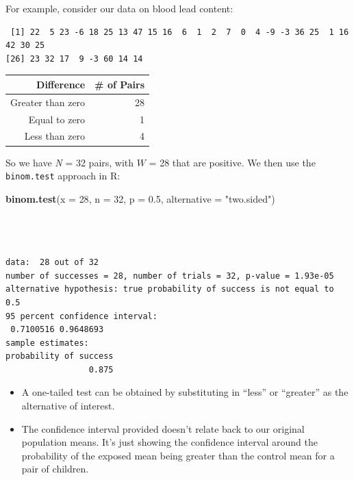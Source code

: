 \documentclass[
]{book}
\newenvironment{Shaded}{\begin{snugshade}}{\end{snugshade}}
\newcommand{\DataTypeTok}[1]{\textcolor[rgb]{0.13,0.29,0.53}{#1}}
\newcommand{\DecValTok}[1]{\textcolor[rgb]{0.00,0.00,0.81}{#1}}
\newcommand{\FloatTok}[1]{\textcolor[rgb]{0.00,0.00,0.81}{#1}}
\newcommand{\KeywordTok}[1]{\textcolor[rgb]{0.13,0.29,0.53}{\textbf{#1}}}
\newcommand{\NormalTok}[1]{#1}
\newcommand{\OperatorTok}[1]{\textcolor[rgb]{0.81,0.36,0.00}{\textbf{#1}}}
\newcommand{\StringTok}[1]{\textcolor[rgb]{0.31,0.60,0.02}{#1}}
\providecommand{\tightlist}{%
  \setlength{\itemsep}{0pt}\setlength{\parskip}{0pt}}
\begin{document}
For example, consider our data on blood lead content:

\begin{Shaded}
\end{Shaded}

\begin{verbatim}
 [1] 22  5 23 -6 18 25 13 47 15 16  6  1  2  7  0  4 -9 -3 36 25  1 16 42 30 25
[26] 23 32 17  9 -3 60 14 14
\end{verbatim}

\begin{longtable}[]{@{}rr@{}}
\toprule
Difference & \# of Pairs\tabularnewline
\midrule
\endhead
Greater than zero & 28\tabularnewline
Equal to zero & 1\tabularnewline
Less than zero & 4\tabularnewline
\bottomrule
\end{longtable}

So we have \emph{N} = 32 pairs, with \(W\) = 28 that are positive. We then use the \texttt{binom.test} approach in R:

\begin{Shaded}
\begin{Highlighting}[]
\KeywordTok{binom.test}\NormalTok{(}\DataTypeTok{x =} \DecValTok{28}\NormalTok{, }\DataTypeTok{n =} \DecValTok{32}\NormalTok{, }\DataTypeTok{p =} \FloatTok{0.5}\NormalTok{, }
           \DataTypeTok{alternative =} \StringTok{"two.sided"}\NormalTok{)}
\end{Highlighting}
\end{Shaded}

\begin{verbatim}



data:  28 out of 32
number of successes = 28, number of trials = 32, p-value = 1.93e-05
alternative hypothesis: true probability of success is not equal to 0.5
95 percent confidence interval:
 0.7100516 0.9648693
sample estimates:
probability of success 
                 0.875 
\end{verbatim}

\begin{itemize}
\tightlist
\item
  A one-tailed test can be obtained by substituting in ``less'' or ``greater'' as the alternative of interest.
\item
  The confidence interval provided doesn't relate back to our original population means. It's just showing the confidence interval around the probability of the exposed mean being greater than the control mean for a pair of children.
\end{itemize}
\end{document}
